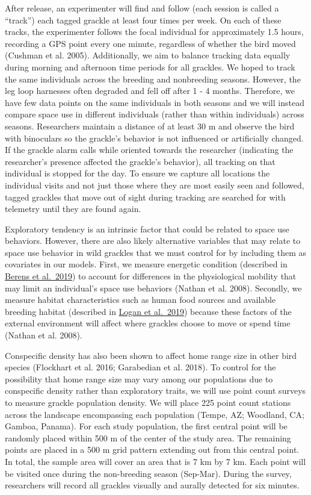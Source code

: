 \documentclass[
]{article}
\begin{document}
After release, an experimenter will find and follow (each session is
called a ``track'') each tagged grackle at least four times per week. On
each of these tracks, the experimenter follows the focal individual for
approximately 1.5 hours, recording a GPS point every one minute,
regardless of whether the bird moved (Cushman et al. 2005).
Additionally, we aim to balance tracking data equally during morning and
afternoon time periods for all grackles. We hoped to track the same
individuals across the breeding and nonbreeding seasons. However, the
leg loop harnesses often degraded and fell off after 1 - 4 months.
Therefore, we have few data points on the same individuals in both
seasons and we will instead compare space use in different individuals
(rather than within individuals) across seasons. Researchers maintain a
distance of at least 30 m and observe the bird with binoculars so the
grackle's behavior is not influenced or artificially changed. If the
grackle alarm calls while oriented towards the researcher (indicating
the researcher's presence affected the grackle's behavior), all tracking
on that individual is stopped for the day. To ensure we capture all
locations the individual visits and not just those where they are most
easily seen and followed, tagged grackles that move out of sight during
tracking are searched for with telemetry until they are found again.

Exploratory tendency is an intrinsic factor that could be related to
space use behaviors. However, there are also likely alternative
variables that may relate to space use behavior in wild grackles that we
must control for by including them as covariates in our models. First,
we measure energetic condition (described in
\href{http://corinalogan.com/Preregistrations/gcondition.html}{Berens et
al.~2019}) to account for differences in the physiological mobility that
may limit an individual's space use behaviors (Nathan et al. 2008).
Secondly, we measure habitat characteristics such as human food sources
and available breeding habitat (described in
\href{http://corinalogan.com/Preregistrations/g_flexforaging.html}{Logan
et al.~2019}) because these factors of the external environment will
affect where grackles choose to move or spend time (Nathan et al. 2008).

Conspecific density has also been shown to affect home range size in
other bird species (Flockhart et al. 2016; Garabedian et al. 2018). To
control for the possibility that home range size may vary among our
populations due to conspecific density rather than exploratory traits,
we will use point count surveys to measure grackle population density.
We will place 225 point count stations across the landscape encompassing
each population (Tempe, AZ; Woodland, CA; Gamboa, Panama). For each
study population, the first central point will be randomly placed within
500 m of the center of the study area. The remaining points are placed
in a 500 m grid pattern extending out from this central point. In total,
the sample area will cover an area that is 7 km by 7 km. Each point will
be visited once during the non-breeding season (Sep-Mar). During the
survey, researchers will record all grackles visually and aurally
detected for six minutes.
\end{document}
